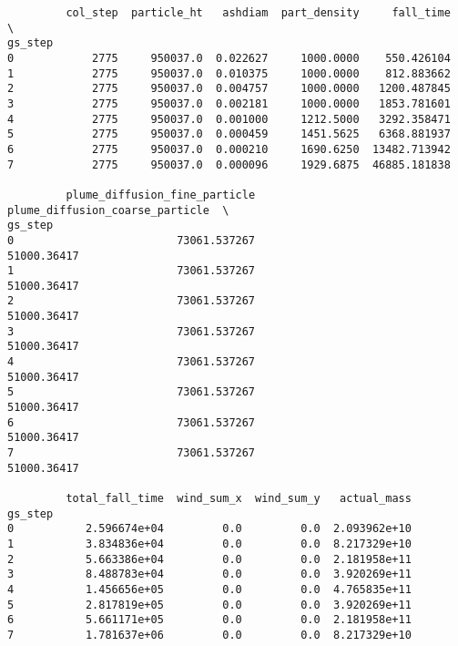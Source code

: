 \documentclass[11pt]{article}
\begin{document}
    
    \begin{verbatim}
         col_step  particle_ht   ashdiam  part_density     fall_time  \
gs_step                                                                
0            2775     950037.0  0.022627     1000.0000    550.426104   
1            2775     950037.0  0.010375     1000.0000    812.883662   
2            2775     950037.0  0.004757     1000.0000   1200.487845   
3            2775     950037.0  0.002181     1000.0000   1853.781601   
4            2775     950037.0  0.001000     1212.5000   3292.358471   
5            2775     950037.0  0.000459     1451.5625   6368.881937   
6            2775     950037.0  0.000210     1690.6250  13482.713942   
7            2775     950037.0  0.000096     1929.6875  46885.181838   

         plume_diffusion_fine_particle  plume_diffusion_coarse_particle  \
gs_step                                                                   
0                         73061.537267                      51000.36417   
1                         73061.537267                      51000.36417   
2                         73061.537267                      51000.36417   
3                         73061.537267                      51000.36417   
4                         73061.537267                      51000.36417   
5                         73061.537267                      51000.36417   
6                         73061.537267                      51000.36417   
7                         73061.537267                      51000.36417   

         total_fall_time  wind_sum_x  wind_sum_y   actual_mass  
gs_step                                                         
0           2.596674e+04         0.0         0.0  2.093962e+10  
1           3.834836e+04         0.0         0.0  8.217329e+10  
2           5.663386e+04         0.0         0.0  2.181958e+11  
3           8.488783e+04         0.0         0.0  3.920269e+11  
4           1.456656e+05         0.0         0.0  4.765835e+11  
5           2.817819e+05         0.0         0.0  3.920269e+11  
6           5.661171e+05         0.0         0.0  2.181958e+11  
7           1.781637e+06         0.0         0.0  8.217329e+10  
    \end{verbatim}

    
    \begin{center}
    \end{center}
    { \hspace*{\fill} \\}
    

    
    
    
    
\end{document}
